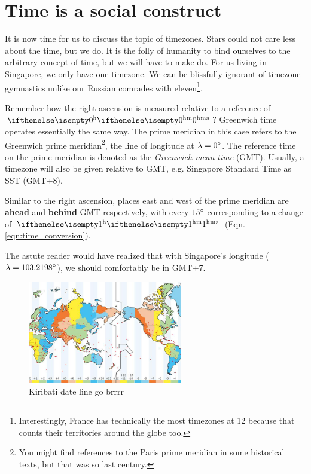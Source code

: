 \documentclass{article}
\begin{document}
\section{Time is a social construct}
It is now time for us to discuss the topic of timezones. Stars could not care less about the time, but we do. It is the folly of humanity to bind ourselves to the arbitrary concept of time, but we will have to make do. For us living in Singapore, we only have one timezone. We can be blissfully ignorant of timezone gymnastics unlike our Russian comrades with eleven\footnote{Interestingly, France has technically the most timezones at 12 because that counts their territories around the globe too.}.

Remember how the right ascension is measured relative to a reference of $\hms{0}{}{}$? Greenwich time operates essentially the same way. The prime meridian in this case refers to the Greenwich prime meridian\footnote{You might find references to the Paris prime meridian in some historical texts, but that was so last century.}, the line of longitude at $\lambda=0{}^{\circ}$. The reference time on the prime meridian is denoted as the \textit{Greenwich mean time} (GMT). Usually, a timezone will also be given relative to GMT, e.g. Singapore Standard Time as SST (GMT+8).

Similar to the right ascension, places east and west of the prime meridian are \textbf{ahead} and \textbf{behind} GMT respectively, with every $15{}^{\circ}$ corresponding to a change of $\hms{1}{}{}$ (Eqn.\;\ref{eqn:time_conversion}). 

The astute reader would have realized that with Singapore's longitude ($\lambda = 103.2198{}^{\circ}$), we should comfortably be in GMT+7.

\begin{figure}[h]
    \centering
    \includegraphics[width=0.6\textwidth]{img/idl.jpg}
    \caption{Kiribati date line go brrrr}
    \label{fig:idl}
\end{figure}
\end{document}
